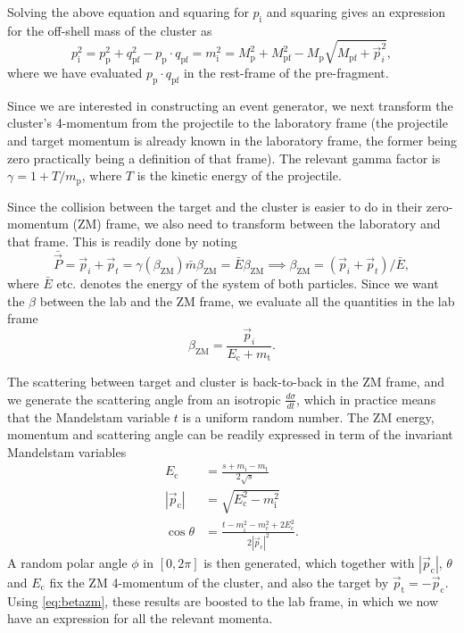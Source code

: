 Solving the above equation and squaring for $p_\text{i}$ and squaring gives an expression for the off-shell mass of the cluster as
\begin{equation}
p_\text{i}^2 = p_\text{p}^2 +  q_\text{pf}^2 -  p_\text{p}\cdot q_\text{pf}= m_\text{i}^2 =M_\text{p}^2 + M_\text{pf}^2 - M_\text{p}\sqrt{M_\text{pf} + \vec{p}_i^2},
\end{equation}
where we have evaluated $p_\text{p}\cdot q_\text{pf}$ in the rest-frame of the pre-fragment.

Since we are interested in constructing an event generator, we next transform the cluster's 4-momentum from the projectile to the laboratory frame (the projectile and target momentum is already known in the laboratory frame, the former being zero practically being a definition of that frame). The relevant gamma factor is
$\gamma = 1 + T/m_\text{p}$, where $T$ is the kinetic energy of the projectile.

Since the collision between the target and the cluster is easier to do in their zero-momentum (ZM) frame, we also need to transform between the laboratory and that frame. This is readily done by noting
\begin{equation}
\bar{\vec{P}} = \vec{p}_i + \vec{p}_t = \gamma(\beta_\text{ZM}) \bar{m} \beta_\text{ZM} = \bar{E}\beta_\text{ZM} \implies \beta_\text{ZM} = (\vec{p}_i + \vec{p}_t)/\bar{E},
\end{equation}
where $\bar{E}$ etc. denotes the energy of the system of both particles. Since we want the $\beta$ between the lab and the ZM frame, we evaluate all the quantities in the lab frame
\begin{equation}
\beta_\text{ZM} = \frac{\vec{p}_i}{E_\text{c} + m_\text{t}}. \label{eq:betazm}
\end{equation}

The scattering between target and cluster is back-to-back in the ZM frame, and we generate the scattering angle from an isotropic $\tfrac{d\sigma}{dt}$, which in practice means that the Mandelstam variable $t$ is a uniform random number. The ZM energy, momentum and scattering angle can be readily expressed in term of the invariant Mandelstam variables
\begin{align}
E_\text{c} &= \frac{s+m_\text{i} - m_\text{t}}{2\sqrt{s}} \\
|\vec{p}_\text{c}| &= \sqrt{E_\text{c}^2 - m_\text{i}^2} \\
\cos{\theta} &= \frac{t-m_\text{i}^2-m_\text{c}^2 + 2E_\text{c}^2}{2|\vec{p}_\text{c}|^2}.
\end{align}
A random polar angle $\phi$ in $[0,2\pi]$ is then generated, which together with $|\vec{p}_\text{c}|$, $\theta$ and $E_\text{c}$ fix the ZM 4-momentum of the cluster, and also the target by $\vec{p}_\text{t} = -\vec{p}_\text{c}$. Using \eqref{eq:betazm}, these results are boosted to the lab frame, in which we now have an expression for all the relevant momenta.

